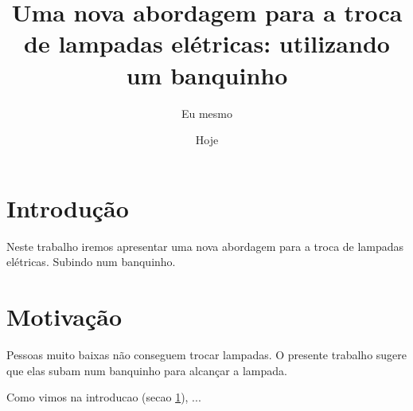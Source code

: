 \documentclass{article}
\author{Eu mesmo}
\date{Hoje}
\title{Uma nova abordagem para a troca de
       lampadas elétricas: utilizando um banquinho}
\begin{document}
\maketitle

\newpage

\section{Introdução}
\label{sec:intro}

Neste trabalho  iremos apresentar uma nova abordagem
para a troca  de lampadas elétricas.
Subindo  num  banquinho. %


\section{Motivação}
\label{sec:motiv}

Pessoas muito baixas não conseguem trocar lampadas.
O presente trabalho sugere que elas subam num
banquinho para alcançar a lampada.

Como vimos na introducao (secao \ref{sec:intro}),
...
\end{document}
